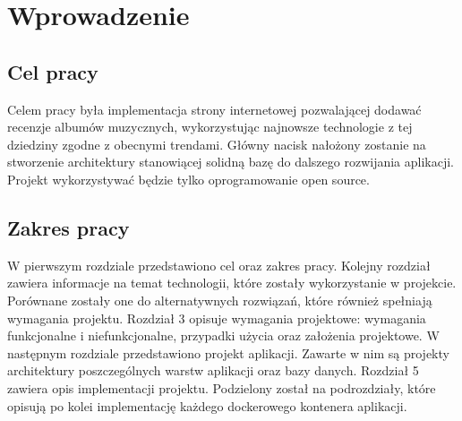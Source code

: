 \chapter{Wprowadzenie}
\label{sec:wprowadzenie}

\section{Cel pracy}
	Celem pracy była implementacja strony internetowej pozwalającej dodawać recenzje albumów muzycznych,
	wykorzystując najnowsze technologie z tej dziedziny zgodne z obecnymi trendami.
	Główny nacisk nałożony zostanie na stworzenie architektury stanowiącej solidną bazę do dalszego rozwijania aplikacji.
	Projekt wykorzystywać będzie tylko oprogramowanie open source.

\section{Zakres pracy}
	W pierwszym rozdziale przedstawiono cel oraz zakres pracy.
	Kolejny rozdział zawiera informacje na temat technologii, które zostały wykorzystanie w projekcie.
	Porównane zostały one do alternatywnych rozwiązań, które również spełniają wymagania projektu.
	Rozdział 3 opisuje wymagania projektowe: wymagania funkcjonalne i niefunkcjonalne, przypadki użycia oraz założenia projektowe.
	W następnym rozdziale przedstawiono projekt aplikacji.
	Zawarte w nim są projekty architektury poszczególnych warstw aplikacji oraz bazy danych.
	Rozdział 5 zawiera opis implementacji projektu.
	Podzielony został na podrozdziały, które opisują po kolei implementację każdego dockerowego kontenera aplikacji.
